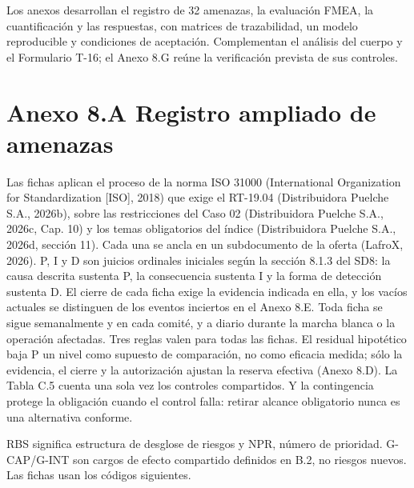 
Los anexos desarrollan el registro de 32 amenazas, la evaluación FMEA, la cuantificación y las respuestas, con matrices de trazabilidad, un modelo reproducible y condiciones de aceptación. Complementan el análisis del cuerpo y el Formulario T-16; el Anexo 8.G reúne la verificación prevista de sus controles.

\clearpage
\section*{Anexo 8.A \textemdash{} Registro ampliado de amenazas}

Las fichas aplican el proceso de la norma ISO 31000 (International Organization for Standardization [ISO], 2018) que exige el RT-19.04 (Distribuidora Puelche S.A., 2026b), sobre las restricciones del Caso 02 (Distribuidora Puelche S.A., 2026c, Cap. 10) y los temas obligatorios del índice (Distribuidora Puelche S.A., 2026d, sección 11). Cada una se ancla en un subdocumento de la oferta (LafroX, 2026). P, I y D son juicios ordinales iniciales según la sección 8.1.3 del SD8: la causa descrita sustenta P, la consecuencia sustenta I y la forma de detección sustenta D. El cierre de cada ficha exige la evidencia indicada en ella, y los vacíos actuales se distinguen de los eventos inciertos en el Anexo 8.E. Toda ficha se sigue semanalmente y en cada comité, y a diario durante la marcha blanca o la operación afectadas. Tres reglas valen para todas las fichas. El residual hipotético baja P un nivel como supuesto de comparación, no como eficacia medida; sólo la evidencia, el cierre y la autorización ajustan la reserva efectiva (Anexo 8.D). La Tabla C.5 cuenta una sola vez los controles compartidos. Y la contingencia protege la obligación cuando el control falla: retirar alcance obligatorio nunca es una alternativa conforme.

RBS significa estructura de desglose de riesgos y NPR, número de prioridad. G-CAP/G-INT son cargos de efecto compartido definidos en B.2, no riesgos nuevos. Las fichas usan los códigos siguientes.


